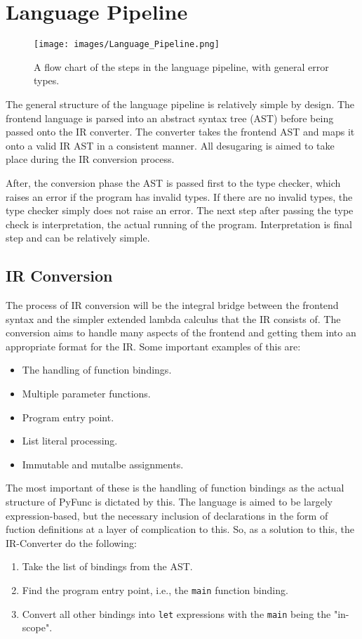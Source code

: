 \documentclass{l4proj}
\begin{document}
\section{Language Pipeline}
\begin{figure}[!h]
    \texttt{[image: images/Language\_Pipeline.png]}
    \caption{A flow chart of the steps in the language pipeline, with general error types.}
\end{figure}


The general structure of the language pipeline is relatively simple by design.
The frontend language is parsed into an abstract syntax tree (AST) before being passed onto the IR converter.
The converter takes the frontend AST and maps it onto a valid IR AST in a consistent manner.
All desugaring is aimed to take place during the IR conversion process.

After, the conversion phase the AST is passed first to the type checker, which raises an error if the program has invalid types.
If there are no invalid types, the type checker simply does not raise an error.
The next step after passing the type check is interpretation, the actual running of the program.
Interpretation is final step and can be relatively simple.


\subsection{IR Conversion}

The process of IR conversion will be the integral bridge between the frontend syntax and the simpler extended lambda calculus that the IR consists of.
The conversion aims to handle many aspects of the frontend and getting them into an appropriate format for the IR.
Some important examples of this are:
\begin{itemize}
    \item The handling of function bindings.
    \item Multiple parameter functions.
    \item Program entry point.
    \item List literal processing.
    \item Immutable and mutalbe assignments.
\end{itemize}

The most important of these is the handling of function bindings as the actual structure of PyFunc is dictated by this.
The language is aimed to be largely expression-based, but the necessary inclusion of declarations in the form of fuction definitions at a layer of complication to this.
So, as a solution to this, the IR-Converter do the following:
\begin{enumerate}
    \item Take the list of bindings from the AST.
    \item Find the program entry point, i.e., the \texttt{main} function binding.
    \item Convert all other bindings into \texttt{let} expressions with the \texttt{main} being the "in-scope".
\end{enumerate}
\end{document}
